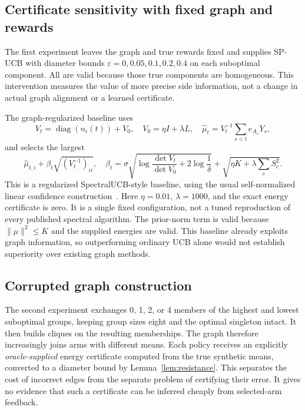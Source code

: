 \documentclass[11pt]{article}
\newcommand{\diag}{\operatorname{diag}}
\begin{document}
\subsection{Certificate sensitivity with fixed graph and rewards}
The first experiment leaves the graph and true rewards fixed and supplies SP-UCB with diameter bounds $\varepsilon=0,0.05,0.1,0.2,0.4$ on each suboptimal component. All are valid because those true components are homogeneous. This intervention measures the value of more precise side information, not a change in actual graph alignment or a learned certificate.

The graph-regularized baseline uses
\begin{equation}
 V_t=\diag(n_i(t))+V_0,\quad V_0=\eta I+\lambda L,\quad
 \widehat\mu_t=V_t^{-1}\sum_{s<t}e_{A_s}Y_s,
\end{equation}
and selects the largest
\begin{equation}
 \widehat\mu_{t,i}+\beta_t\sqrt{(V_t^{-1})_{ii}},\quad
 \beta_t=\sigma\sqrt{\log\frac{\det V_t}{\det V_0}+2\log\frac1\delta}
       +\sqrt{\eta K+\lambda\sum_cS_c^2}.
\end{equation}
This is a regularized SpectralUCB-style baseline, using the usual self-normalized linear confidence construction~\cite{kocak2020,abbasi2011}. Here $\eta=0.01$, $\lambda=1000$, and the exact energy certificate is zero. It is a single fixed configuration, not a tuned reproduction of every published spectral algorithm. The prior-norm term is valid because $\|\mu\|^2\le K$ and the supplied energies are valid. This baseline already exploits graph information, so outperforming ordinary UCB alone would not establish superiority over existing graph methods.

\subsection{Corrupted graph construction}
The second experiment exchanges 0, 1, 2, or 4 members of the highest and lowest suboptimal groups, keeping group sizes eight and the optimal singleton intact. It then builds cliques on the resulting memberships. The graph therefore increasingly joins arms with different means. Each policy receives an explicitly \emph{oracle-supplied} energy certificate computed from the true synthetic means, converted to a diameter bound by Lemma~\ref{lem:resistance}. This separates the cost of incorrect edges from the separate problem of certifying their error. It gives no evidence that such a certificate can be inferred cheaply from selected-arm feedback.
\end{document}
